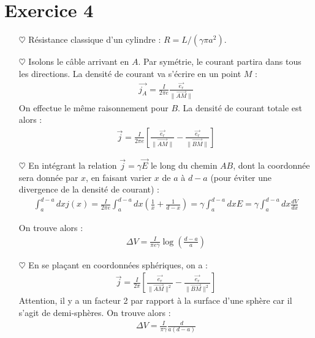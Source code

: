 \documentclass{report}
\begin{document}
\section*{Exercice 4}

\begin{itemize}

	\item[$\heartsuit$] Résistance classique d'un cylindre : $R=L/(\gamma\pi a^2)$.
	
	\item[$\heartsuit$] Isolons le câble arrivant en $A$. Par symétrie, le courant partira dans tous les directions. La densité de courant va s'écrire en un point $M$ :
	\begin{align*}
		\vec{j_A}=\frac{I}{2\pi e }\frac{\vec{e_r}}{\|\vec{AM} \|}
	\end{align*}
	On effectue le même raisonnement pour $B$. La densité de courant totale est alors :
	\begin{align*}
		\vec{j}=\frac{I}{2\pi e }\left[ \frac{\vec{e_r}}{\|\vec{AM} \|} - \frac{\vec{e_r}}{\|\vec{BM} \|}\right] 
	\end{align*}
	
	\item[$\heartsuit$] En intégrant la relation $\vec{j}=\gamma\vec{E}$ le long du chemin $AB$, dont la coordonnée sera donnée par $x$, en faisant varier $x$ de $a$ à $d-a$ (pour éviter une divergence de la densité de courant) :
	\begin{align*}
		\int_a^{d-a}dx j(x)=\frac{I}{2\pi e}\int_a^{d-a}dx\left(\frac{1}{x}+\frac{1}{d-x} \right) =\gamma\int_a^{d-a}dxE=\gamma\int_a^{d-a}dx\frac{dV}{dx}
	\end{align*}
	
	On trouve alors :
	\begin{align*}
		\Delta V = \frac{I}{\pi e\gamma}\log\left(\frac{d-a}{a} \right) 
	\end{align*}

	\item[$\heartsuit$] En se plaçant en coordonnées sphériques, on a :
	\begin{align*}
		\vec{j}=\frac{I}{2\pi}\left[ \frac{\vec{e_r}}{\|\vec{AM} \|^2} - \frac{\vec{e_r}}{\|\vec{BM} \|^2}\right] 
	\end{align*}
	Attention, il y a un facteur 2 par rapport à la surface d'une sphère car il s'agit de demi-sphères.
		On trouve alors :
	\begin{align*}
		\Delta V = \frac{I}{\pi \gamma}\frac{d}{a(d-a)}
	\end{align*}
	
\end{itemize}
\end{document}
